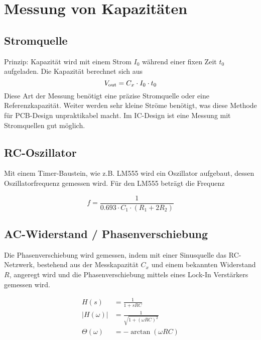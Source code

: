 \section{Messung von Kapazitäten}

\subsection{Stromquelle}
Prinzip: Kapazität wird mit einem Strom $I_0$ während einer fixen Zeit 
$t_0$ aufgeladen. Die Kapazität berechnet sich aus
\begin{equation*}
	V_{\operatorname{\text{out}}} = C_x \cdot I_0 \cdot t_0
\end{equation*}
Diese Art der Messung benötigt eine präzise Stromquelle oder eine
Referenzkapazität. Weiter werden sehr kleine Ströme benötigt, was
diese Methode für PCB-Design unpraktikabel macht. Im IC-Design
ist eine Messung mit Stromquellen gut möglich.

\subsection{RC-Oszillator}
Mit einem Timer-Baustein, wie z.B. LM555 wird ein Oszillator aufgebaut,
dessen Oszillatorfrequenz gemessen wird. Für den LM555 beträgt die Frequenz

\begin{equation*}
	f = \frac{1}{0.693 \cdot C_1 \cdot (R_1 + 2 R_2) }
\end{equation*}

\subsection{AC-Widerstand / Phasenverschiebung}
Die Phasenverschiebung wird gemessen, indem mit einer Sinusquelle das RC-Netzwerk,
bestehend aus der Messkapazität $C_x$ und einem bekannten Widerstand $R$,
angeregt wird und die Phasenverschiebung mittels eines Lock-In Verstärkers
gemessen wird.

\begin{multicols}{2}
	\centering
		
	\vfill\columnbreak
	\begin{align*}
		H(s) &= \frac{1}{1+sRC} \\
		\left|H(\omega)\right| &= \frac{1}{\sqrt{1+\left(\omega RC\right)^2}} \\
		\Theta(\omega) &= -\arctan\left(\omega RC\right)
	\end{align*}
\end{multicols}

